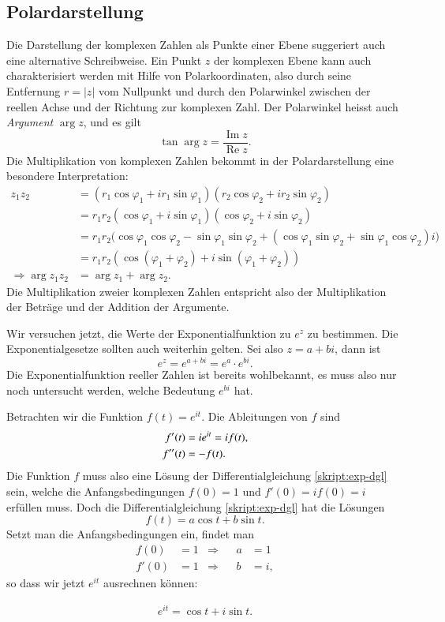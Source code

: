\subsection{Polardarstellung}
Die Darstellung der komplexen Zahlen als Punkte einer Ebene suggeriert
auch eine alternative Schreibweise.
Ein Punkt $z$ der komplexen Ebene kann auch charakterisiert werden mit Hilfe von
Polarkoordinaten, also durch seine Entfernung $r=|z|$ vom Nullpunkt
und durch den Polarwinkel zwischen der reellen Achse und der Richtung
zur komplexen Zahl. Der Polarwinkel heisst auch {\em Argument} $\operatorname{arg}z$,
%
und es gilt
\[
\tan\operatorname{arg}z=\frac{\operatorname{Im}z}{\operatorname{Re}z}.
\]
Die Multiplikation von komplexen Zahlen bekommt in der Polardarstellung
eine besondere Interpretation:
\begin{align*}
z_1z_2
&=
(r_1\cos\varphi_1+ir_1\sin\varphi_1) (r_2\cos\varphi_2+ir_2\sin\varphi_2)
\\
&=
r_1r_2(\cos\varphi_1+i\sin\varphi_1) (\cos\varphi_2+i\sin\varphi_2)
\\
&=
r_1r_2\bigl(
\cos\varphi_1\cos\varphi_2-\sin\varphi_1\sin\varphi_2 +
(\cos\varphi_1\sin\varphi_2+\sin\varphi_1\cos\varphi_2)i\bigr)
\\
&=
r_1r_2(\cos(\varphi_1+\varphi_2)+i\sin(\varphi_1+\varphi_2))
\\
\Rightarrow \operatorname{arg}z_1z_2&=\arg z_1 + \arg z_2.
\end{align*}
Die Multiplikation zweier komplexen Zahlen entspricht also der
Multiplikation der Beträge und der Addition der Argumente.

Wir versuchen jetzt, die Werte der Exponentialfunktion zu $e^z$ zu
bestimmen.
Die Exponentialgesetze sollten auch weiterhin gelten.
Sei also $z=a+bi$, dann ist
\[
e^z=e^{a+bi}=e^a\cdot e^{bi}.
\]
Die Exponentialfunktion reeller Zahlen ist bereits wohlbekannt, es muss
also nur noch untersucht werden, welche Bedeutung $e^{bi}$ hat.

Betrachten wir die Funktion $f(t)= e^{it}$. Die Ableitungen von $f$ sind
\begin{align}
f'(t)&=ie^{it}=if(t),\notag\\
f''(t)&=-f(t).\label{skript:exp-dgl}
\end{align}
Die Funktion $f$ muss also eine Lösung der Differentialgleichung
\eqref{skript:exp-dgl} sein, welche die Anfangsbedingungen $f(0)=1$ und
$f'(0)=if(0)=i$ erfüllen muss.
Doch die Differentialgleichung \eqref{skript:exp-dgl} hat die Lösungen
\[
f(t)=a\cos t+b\sin t.
\]
Setzt man die Anfangsbedingungen ein, findet man
\begin{align*}
f(0)&=1&\Rightarrow&&a&=1\\
f'(0)&=1&\Rightarrow&&b&=i,
\end{align*}
so dass wir jetzt $e^{it}$ ausrechnen können:
\begin{satz}[Euler]
\begin{align}
e^{it}=\cos t+i\sin t.
\label{skript:euler-formula}
\end{align}
\end{satz}
%

